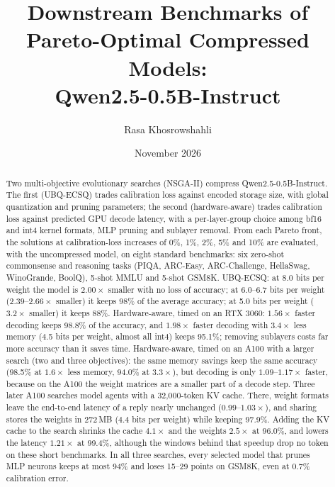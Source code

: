 \documentclass[11pt]{article}
\title{Downstream Benchmarks of Pareto-Optimal Compressed Models:\\
Qwen2.5-0.5B-Instruct}
\author{Rasa Khosrowshahli}
\date{November 2026}
\begin{document}
\maketitle

\begin{abstract}
Two multi-objective evolutionary searches (NSGA-II) compress Qwen2.5-0.5B-Instruct. The first
(UBQ-ECSQ) trades calibration loss against encoded storage size, with global quantization and pruning
parameters; the second (hardware-aware) trades calibration loss against predicted GPU decode latency,
with a per-layer-group choice among bf16 and int4 kernel formats, MLP pruning and sublayer removal.
From each Pareto front, the solutions at calibration-loss increases of 0\%, 1\%, 2\%, 5\% and 10\% are
evaluated, with the uncompressed model, on eight standard benchmarks: six zero-shot commonsense and
reasoning tasks (PIQA, ARC-Easy, ARC-Challenge, HellaSwag, WinoGrande, BoolQ), 5-shot MMLU and 5-shot
GSM8K. UBQ-ECSQ: at 8.0 bits per weight the model is $2.00\times$ smaller with no loss of accuracy; at
6.0--6.7 bits per weight ($2.39$--$2.66\times$ smaller) it keeps 98\% of the average accuracy; at 5.0
bits per weight ($3.2\times$ smaller) it keeps 88\%. Hardware-aware, timed on an RTX 3060:
$1.56\times$ faster decoding keeps 98.8\% of the accuracy, and $1.98\times$ faster decoding with
$3.4\times$ less memory (4.5 bits per weight, almost all int4) keeps 95.1\%; removing sublayers costs
far more accuracy than it saves time. Hardware-aware, timed on an A100 with a larger search (two and
three objectives): the same memory savings keep the same accuracy (98.5\% at $1.6\times$ less memory,
94.0\% at $3.3\times$), but decoding is only $1.09$--$1.17\times$ faster, because on the A100 the
weight matrices are a smaller part of a decode step. Three later A100 searches model agents with a
32{,}000-token KV cache. There, weight formats leave the end-to-end latency of a reply nearly unchanged
($0.99$--$1.03\times$), and sharing stores the weights in 272\,MB (4.4 bits per weight) while keeping
97.9\%. Adding the KV cache to the search shrinks the cache $4.1\times$ and the weights $2.5\times$ at
96.0\%, and lowers the latency $1.21\times$ at 99.4\%, although the windows behind that speedup drop no
token on these short benchmarks. In all three searches, every selected
model that prunes MLP neurons keeps at most 94\% and loses 15--29 points on GSM8K, even at 0.7\%
calibration error.
\end{abstract}

\end{document}
